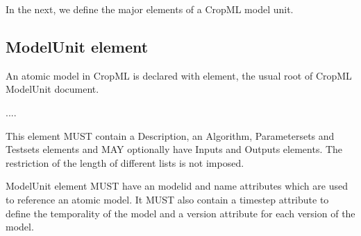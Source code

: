 \documentclass[letterpaper,13pt,english]{sphinxmanual}
\begin{document}
\begin{DUlineblock}{0em}
\item[] In the next, we define the major elements of a CropML model unit.
\end{DUlineblock}


\subsection{ModelUnit element}
\label{\detokenize{user/description:modelunit-element}}
\begin{DUlineblock}{0em}
\item[] An atomic model in CropML is declared with  element,
the usual root of CropML ModelUnit document.
\end{DUlineblock}

%
\begin{sphinxVerbatim}[commandchars=\\\{\}]
    
        ....
\end{sphinxVerbatim}

\begin{DUlineblock}{0em}
\item[] This element MUST contain a Description, an Algorithm, Parametersets and Testsets elements and
MAY optionally have Inputs and Outputs elements. The restriction of the length of different lists is not imposed.
\item[] ModelUnit element MUST have an modelid and name attributes which are used to reference an atomic model. It MUST also contain a timestep attribute to define the temporality of the model and
a version attribute for each version of the model.
\end{DUlineblock}
\end{document}
